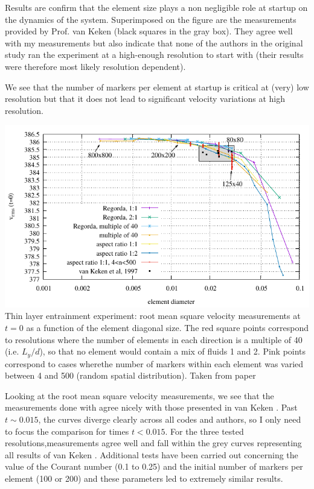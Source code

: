 Results are confirm that 
the element size plays a non negligible role at startup on the dynamics of the system.
Superimposed on the figure are the measurements provided by Prof. van Keken (black squares
in the gray box).
They agree well with my measurements but also indicate that 
none of the authors in the original study ran the experiment at a high-enough resolution
to start with (their results were therefore most likely resolution dependent).

We see that the number of markers per element at startup is critical at 
(very) low resolution but that it does not lead to 
significant velocity variations at high resolution. 

\begin{center}
\includegraphics[width=0.65\linewidth]{images/benchmark_thinlayer/vrms/vrmszero.pdf}\\
{\captionfont  
Thin layer entrainment experiment: root mean square velocity measurements at
$t=0$ as a function of the element diagonal size. 
The red square points correspond to resolutions where the number of elements in each direction 
is a multiple of 40 (i.e. $L_y/d$), so that no element would contain a mix of fluids 1 and 2. 
Pink points correspond to cases wherethe number of markers within each element was varied between 4 and 500 
(random spatial distribution). Taken from \elefant paper \cite{thie14}}
\end{center}


Looking at the root mean square velocity measurements, we see that
the measurements done with \elefant agree nicely with those presented in van Keken \etal \cite{vaks97}. 
Past $t\sim0.015$, the curves diverge clearly across all codes and authors, 
so I only need to focus the comparison for times $t <0.015$. 
For the three tested resolutions,measurements agree well and fall within the grey curves 
representing all results of van Keken \etal. 
Additional tests have been carried out concerning the value of the
Courant number (0.1 to 0.25) and the initial number of markers per element (100 or 200) 
and these parameters led to extremely similar results.

